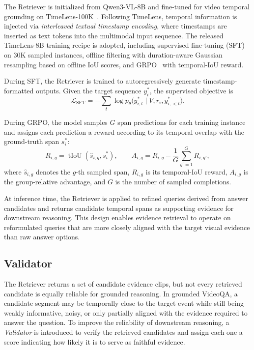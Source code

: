 The Retriever is initialized from Qwen3-VL-8B and fine-tuned for video temporal grounding on TimeLens-100K~\cite{zhang2026timelens}. Following TimeLens, temporal information is injected via \emph{interleaved textual timestamp encoding}, where timestamps are inserted as text tokens into the multimodal input sequence. The released TimeLens-8B training recipe is adopted, including supervised fine-tuning (SFT) on 30K sampled instances, offline filtering with duration-aware Gaussian resampling based on offline IoU scores, and GRPO~\cite{shao2024deepseekmath} with temporal-IoU reward.

During SFT, the Retriever is trained to autoregressively generate timestamp-formatted outputs. Given the target sequence $y_i^\ast$, the supervised objective is
\begin{equation}
\mathcal{L}_{\mathrm{SFT}}
= - \sum_t \log p_\theta \bigl(y^\ast_{i,t} \mid V, r_i, y^\ast_{i,<t}\bigr).
\end{equation}

During GRPO, the model samples $G$ span predictions for each training instance and assigns each prediction a reward according to its temporal overlap with the ground-truth span $s_i^\ast$:
\begin{equation}
R_{i,g} = \operatorname{tIoU}(\hat{s}_{i,g}, s_i^\ast), \qquad
A_{i,g} = R_{i,g} - \frac{1}{G}\sum_{g'=1}^{G} R_{i,g'} ,
\end{equation}
where $\hat{s}_{i,g}$ denotes the $g$-th sampled span, $R_{i,g}$ is its temporal-IoU reward, $A_{i,g}$ is the group-relative advantage, and $G$ is the number of sampled completions.

At inference time, the Retriever is applied to refined queries derived from answer candidates and returns candidate temporal spans as supporting evidence for downstream reasoning. This design enables evidence retrieval to operate on reformulated queries that are more closely aligned with the target visual evidence than raw answer options.


\subsection{Validator}
\label{sec:validator}

The Retriever returns a set of candidate evidence clips, but not every retrieved candidate is equally reliable for grounded reasoning. In grounded VideoQA, a candidate segment may be temporally close to the target event while still being weakly informative, noisy, or only partially aligned with the evidence required to answer the question. To improve the reliability of downstream reasoning, a \emph{Validator} is introduced to verify the retrieved candidates and assign each one a score indicating how likely it is to serve as faithful evidence.

